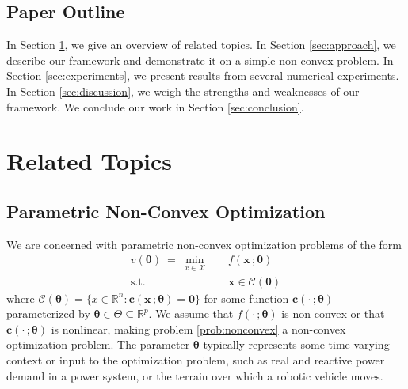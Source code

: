 \documentclass[10pt]{article} %
\theoremstyle{plain}
\theoremstyle{definition}
\theoremstyle{remark}
\begin{document}

\subsection{Paper Outline}

In Section \ref{sec:related-topics}, we give an overview of related topics. In Section \ref{sec:approach}, we describe our framework and demonstrate it on a simple non-convex problem. In Section \ref{sec:experiments}, we present results from several numerical experiments. In Section \ref{sec:discussion}, we weigh the strengths and weaknesses of our framework. We conclude our work in Section \ref{sec:conclusion}.

\section{Related Topics} \label{sec:related-topics}

\subsection*{Parametric Non-Convex Optimization}

We are concerned with parametric non-convex optimization problems of the form
\begin{equation}
\label{prob:nonconvex}
\begin{aligned}
    v(\bm{\theta}) ~=~ \min_{x \in \mathcal{X}} \quad & f(\mathbf{x}\,;\bm{\theta}) \\
    \text{s.t.} \quad & \mathbf{x} \in \mathcal{C}(\bm{\theta})
\end{aligned}
\end{equation}
where $\mathcal{C}(\bm{\theta}) = \{x \in \mathbb{R}^n: \mathbf{c}(\mathbf{x} \,; \bm{\theta}) = \mathbf{0}\}$ for some function $\mathbf{c}(\cdot\,; \bm{\theta})$ parameterized by $\bm{\theta} \in \Theta \subseteq \mathbb{R}^p$. We assume that $f(\cdot\,; \bm{\theta})$ is non-convex or that $\mathbf{c}(\cdot\,;\bm{\theta})$ is nonlinear, making problem \cref{prob:nonconvex}{}{} a non-convex optimization problem. The parameter $\bm{\theta}$ typically represents some time-varying context or input to the optimization problem, such as real and reactive power demand in a power system, or the terrain over which a robotic vehicle moves.
\end{document}
